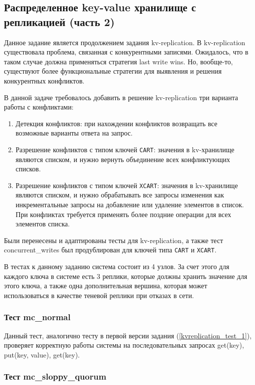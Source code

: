 \documentclass[a4paper,12pt]{extarticle}
\begin{document}
\subsection{Распределенное key-value хранилище с репликацией (часть 2)}

Данное задание является продолжением задания kv-replication.
В kv-replication существовала проблема, связанная с конкурентными записями.
Ожидалось, что в таком случае должна применяться стратегия last write wins.
Но, вообще-то, существуют более функциональные стратегии для выявления и решения конкурентных конфликтов.

В данной задаче требовалось добавить в решение kv-replication три варианта работы с конфликтами:
\begin{enumerate}
    \item Детекция конфликтов: при нахождении конфликтов возвращать все возможные варианты ответа на запрос.
    \item Разрешение конфликтов с типом ключей \texttt{CART}: значения в kv-хранилище являются списком, и нужно вернуть объединение всех конфликтующих списков.
    \item Разрешение конфликтов с типом ключей \texttt{XCART}: значения в kv-хранилище являются списком, и нужно обрабатывать все запросы изменения как инкрементальные запросы на добавление или удаление элементов в список.
При конфликтах требуется применять более поздние операции для всех элементов списка.
\end{enumerate}


Были перенесены и адаптированы тесты для kv-replication, а также тест concurrent\_writes был продублирован для ключей типа \texttt{CART} и \texttt{XCART}.

В тестах к данному заданию система состоит из 4 узлов.
За счет этого для каждого ключа в системе есть 3 реплики, которые должны хранить значение для этого ключа, а также одна дополнительная вершина, которая может использоваться в качестве теневой реплики при отказах в сети.


\subsubsection{Тест mc\_normal}

Данный тест, аналогично тесту в первой версии задания (\cref{kvreplication_test_1}), проверяет корректную работы системы на последовательных запросах get(key), put(key, value), get(key).

\subsubsection{Тест mc\_sloppy\_quorum}
\end{document}
